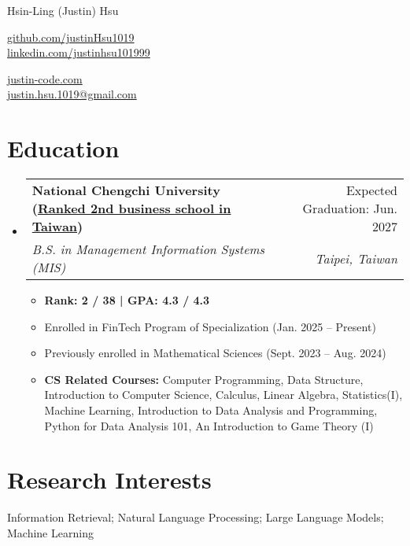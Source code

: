 \documentclass[letterpaper,10pt]{article}
\makeatletter
\newcommand{\resumeItem}[1]{
  \item\small{
    {#1 \vspace{-2pt}}
  }
}
\newcommand{\resumeSubheading}[4]{
  \vspace{-2pt}\item
    \begin{tabular*}{0.97\textwidth}[t]{l@{\extracolsep{\fill}}r}
      \textbf{#1} & #2 \\
      \textit{\small#3} & \textit{\small #4} \\
    \end{tabular*}\vspace{-7pt}
}
\newcommand{\resumeSubHeadingListStart}{\begin{itemize}[leftmargin=0.15in, label={}]}
\newcommand{\resumeSubHeadingListEnd}{\end{itemize}}
\newcommand{\resumeItemListStart}{\begin{itemize}}
\newcommand{\resumeItemListEnd}{\end{itemize}\vspace{-5pt}}
\makeatother
\begin{document}
\begin{center}
    {\LARGE Hsin-Ling (Justin) Hsu} \\ \vspace{2pt}
    \begin{multicols}{2}
    \begin{flushleft}
    \href{{https://github.com/justinHsu1019}}{github.com/justinHsu1019}\\
    \href{{https://www.linkedin.com/in/justinhsu101999}}{linkedin.com/justinhsu101999}
    \end{flushleft}

    \begin{flushright}
    \href{{https://justin-code.com}}{justin-code.com}\\
    \href{mailto:justin.hsu.1019@gmail.com}{justin.hsu.1019@gmail.com}
    \end{flushright}
    \end{multicols}
\end{center}

\vspace{-2pt}
\section{Education}
  \resumeSubHeadingListStart
      \resumeSubheading
      {National Chengchi University \normalfont(\href{https://www.eduniversal-ranking.com/business-school-university-ranking-in-taiwan-region-china.html}{Ranked 2nd business school in Taiwan})}{Expected Graduation: Jun. 2027}
      {B.S. in Management Information Systems (MIS)}{Taipei, Taiwan}
      \resumeItemListStart
      \vspace{0.3em}
        \resumeItem{\textbf{Rank: 2 / 38 | GPA: 4.3 / 4.3}}
        \resumeItem{Enrolled in FinTech Program of Specialization (Jan. 2025 -- Present)}
        \resumeItem{Previously enrolled in Mathematical Sciences (Sept. 2023 -- Aug. 2024)}
        \resumeItem{\textbf{CS Related Courses:} Computer Programming, Data Structure, Introduction to Computer Science, Calculus, Linear Algebra, Statistics(I), Machine Learning, Introduction to Data Analysis and Programming, Python for Data Analysis 101, An Introduction to Game Theory (I)}
      \resumeItemListEnd
  \resumeSubHeadingListEnd

\section{Research Interests}
Information Retrieval; Natural Language Processing; Large Language Models; Machine Learning
\end{document}
